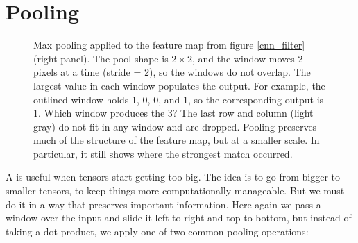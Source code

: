 
\section{Pooling}\label{sect_pooling}


\begin{figure}[h]
\centering
{}
\caption[Jeff Yoshimi.]{Max pooling applied to the feature map from figure \ref{cnn_filter} (right panel). The pool shape is $2 \times 2$, and the window moves 2 pixels at a time (stride = 2), so the windows do not overlap. The largest value in each window populates the output. For example, the outlined window holds 1, 0, 0, and 1, so the corresponding output is 1. Which window produces the 3? The last row and column (light gray) do not fit in any window and are dropped. Pooling preserves much of the structure of the feature map, but at a smaller scale. In particular, it still shows where the strongest match occurred.}
\label{maxPooling}
\end{figure}

A  is useful when tensors start getting too big. The idea is to go from bigger to smaller tensors, to keep things more computationally manageable. But we must do it in a way that preserves important information. Here again we pass a window over the input and slide it left-to-right and top-to-bottom, but instead of taking a dot product, we apply one of two common pooling operations:

